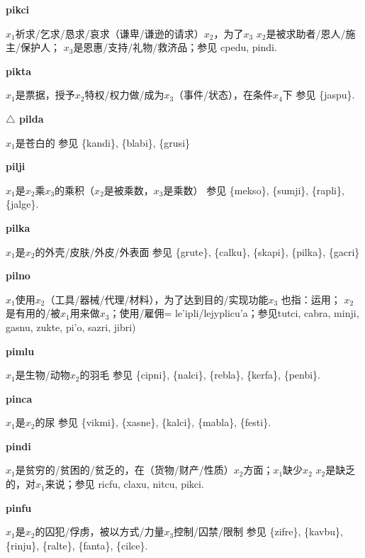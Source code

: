 \documentclass[notitlepage,twocolumn,a4paper,10pt]{book}
\begin{document}
{\sffamily\bfseries pikci} $x_1$祈求\slash{}乞求\slash{}恳求\slash{}哀求（谦卑\slash{}谦逊的请求）$x_2$，为了$x_3$ \textemdash{} $x_2$是被求助者\slash{}恩人\slash{}施主\slash{}保护人； $x_3$是恩惠\slash{}支持\slash{}礼物\slash{}救济品；参见 {cpedu}, {pindi}.

{\sffamily\bfseries pikta} $x_1$是票据，授予$x_2$特权\slash{}权力做\slash{}成为$x_3$（事件\slash{}状态），在条件$x_4$下 \textemdash{} 参见 \{jaspu\}.

{\sffamily\bfseries $\triangle$ pilda} $x_1$是苍白的 \textemdash{} 参见 \{kandi\}, \{blabi\}, \{grusi\}

{\sffamily\bfseries pilji}\enspace {\ttfamily\bfseries[        pi'i]}  $x_1$是$x_2$乘$x_3$的乘积（$x_2$是被乘数，$x_3$是乘数） \textemdash{} 参见 \{mekso\}, \{sumji\}, \{rapli\}, \{jalge\}.

{\sffamily\bfseries pilka}\enspace {\ttfamily\bfseries[pil     pi'a]}  $x_1$是$x_2$的外壳\slash{}皮肤\slash{}外皮\slash{}外表面 \textemdash{} 参见 \{grute\}, \{calku\}, \{skapi\}, \{pilka\}, \{gacri\}

{\sffamily\bfseries pilno}\enspace {\ttfamily\bfseries[    pli]}  $x_1$使用$x_2$（工具\slash{}器械\slash{}代理\slash{}材料），为了达到目的\slash{}实现功能$x_3$ \textemdash{} 也指：运用； $x_2$是有用的\slash{}被$x_1$用来做$x_3$；使用\slash{}雇佣= {le'ipli}\slash{}{lejyplicu'a}；参见{tutci}, {cabra}, {minji}, {gasnu}, {zukte}, {pi'o}, {sazri}, {jibri})

{\sffamily\bfseries pimlu}\enspace {\ttfamily\bfseries[pim     pi'u]}  $x_1$是生物\slash{}动物$x_2$的羽毛 \textemdash{} 参见 \{cipni\}, \{nalci\}, \{rebla\}, \{kerfa\}, \{penbi\}.

{\sffamily\bfseries pinca} $x_1$是$x_2$的尿 \textemdash{} 参见 \{vikmi\}, \{xasne\}, \{kalci\}, \{mabla\}, \{festi\}.

{\sffamily\bfseries pindi}\enspace {\ttfamily\bfseries[pid]}  $x_1$是贫穷的\slash{}贫困的\slash{}贫乏的，在（货物\slash{}财产\slash{}性质）$x_2$方面；$x_1$缺少$x_2$ \textemdash{} $x_2$是缺乏的，对$x_1$来说；参见 {ricfu}, {claxu}, {nitcu}, {pikci}.

{\sffamily\bfseries pinfu}\enspace {\ttfamily\bfseries[pif]}  $x_1$是$x_2$的囚犯\slash{}俘虏，被以方式\slash{}力量$x_3$控制\slash{}囚禁\slash{}限制 \textemdash{} 参见 \{zifre\}, \{kavbu\}, \{rinju\}, \{ralte\}, \{fanta\}, \{cilce\}.
\end{document}
